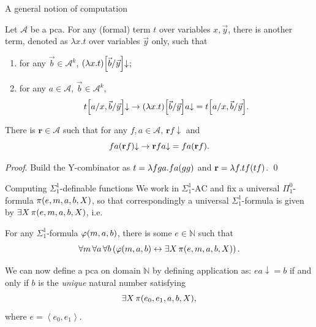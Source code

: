 \documentclass{beamer}
\newcommand{\tuple}[1]{\left\langle #1 \right\rangle}
\begin{document}
\begin{frame}{A general notion of computation}
  \begin{lemma}
    Let $\mathcal{A}$ be a pca. For any (formal) term $t$ over variables $x, \vec{y}$, there is another term, denoted as $\lambda x. t$ over variables $\vec{y}$ only, such that
    \begin{enumerate}
      \item for any $\vec{b} \in \mathcal{A}^k$, $\mleft(\lambda x. t\mright)\mleft[\vec{b}/\vec{y}\mright] {\downarrow}$;
      \item for any $a \in \mathcal{A}$, $\vec{b} \in \mathcal{A}^k$,
            \[t\mleft[a/x, \vec{b}/\vec{y}\mright] {\downarrow} \rightarrow \mleft(\lambda x. t\mright)\mleft[\vec{b}/\vec{y}\mright] a {\downarrow} = t\mleft[a/x, \vec{b}/\vec{y}\mright].\]
    \end{enumerate}
  \end{lemma}

  \begin{lemma}
    There is $\mathbf{r} \in \mathcal{A}$ such that for any $f, a \in \mathcal{A}$, $\mathbf{r} f {\downarrow}$ and
    \[fa \mleft(\mathbf{r} f\mright) {\downarrow} \rightarrow \mathbf{r} fa {\downarrow} = fa \mleft(\mathbf{r} f\mright).\]
  \end{lemma}

  \emph{Proof}. Build the Y-combinator as $t = \lambda fga. fa \mleft(gg\mright)$ and $\mathbf{r} = \lambda f. tf \mleft(tf\mright)$. \qed
\end{frame}

\begin{frame}{Computing $\Sigma^1_1$-definable functions}
  We work in $\Sigma^1_1\text{-}\mathrm{AC}$ and fix a universal $\Pi^0_1$-formula $\pi\mleft(e, m, a, b, X\mright)$, so that  correspondingly a universal $\Sigma^1_1$-formula is given by $\exists X \, \pi\mleft(e, m, a, b, X\mright)$, i.e.
  \begin{theorem}
    For any $\Sigma^1_1$-formula $\varphi\mleft(m, a, b\mright)$, there is some $e \in \mathbb{N}$ such that
    \[\forall m \, \forall a \, \forall b \left(\varphi\mleft(m, a, b\mright) \leftrightarrow \exists X \, \pi\mleft(e, m, a, b, X\mright)\right).\]
  \end{theorem}

  We can now define a pca on domain $\mathbb{N}$ by defining application as: $ea {\downarrow} = b$ if and only if $b$ is the \emph{unique} natural number satisfying
  \[\exists X \, \pi\mleft(e_0, e_1, a, b, X\mright),\]
  where $e = \tuple{e_0, e_1}$.
\end{frame}
\end{document}
